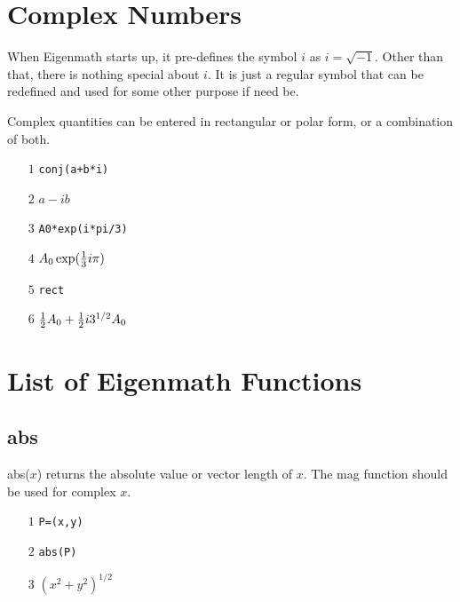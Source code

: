 \documentclass[12pt,openany]{report}
\begin{document}
\newpage

\chapter{Complex Numbers}

\noindent
When Eigenmath starts up, it pre-defines the symbol $i$ as $i=\sqrt{-1}$.
Other than that, there is nothing special about $i$.
It is just a regular symbol that can be redefined and used for some other purpose if need be.

\medskip
\noindent
Complex quantities can be entered in rectangular or polar form, or a combination of both.
\begin{itemize}
\item[$\scriptstyle1$]{\tt conj(a+b*i)}
\item[$\scriptstyle2$]\hspace{50pt} $a-ib$
\item[$\scriptstyle3$]{\tt A0*exp(i*pi/3)}
\item[$\scriptstyle4$]\hspace{50pt} $A_0\exp({1\over3}i\pi)$
\item[$\scriptstyle5$]{\tt rect}
\item[$\scriptstyle6$]\hspace{50pt} ${1\over2}A_0+{1\over2}i3^{1/2}A_0$
\end{itemize}

\newpage

\chapter{List of Eigenmath Functions}

\section*{abs}
abs($x$) returns the absolute value or vector length of $x$.
The mag function should be used for complex $x$.
\begin{itemize}
\item[$\scriptstyle1$]{\tt P=(x,y)}
\item[$\scriptstyle2$]{\tt abs(P)}
\item[$\scriptstyle3$]\hspace{50pt} $(x^2+y^2)^{1/2}$
\end{itemize}
\end{document}
